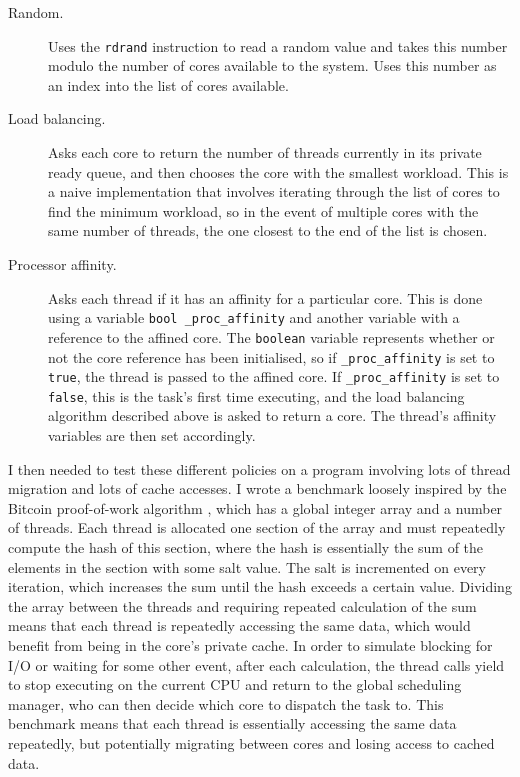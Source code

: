 \documentclass[bsc,frontabs,singlespacing,parskip,deptreport]{infthesis}
\begin{document}
\begin{description}
\item[Random.] Uses the \verb|rdrand| instruction to read a random value and takes this number modulo the number of cores available to the system. Uses this number as an index into the list of cores available.
\item[Load balancing.] Asks each core to return the number of threads currently in its private ready queue, and then chooses the core with the smallest workload. This is a naive implementation that involves iterating through the list of cores to find the minimum workload, so in the event of multiple cores with the same number of threads, the one closest to the end of the list is chosen. 
\item[Processor affinity.] Asks each thread if it has an affinity for a particular core. This is done using a variable \verb|bool _proc_affinity| and another variable with a reference to the affined core. The \verb|boolean| variable represents whether or not the core reference has been initialised, so if \verb|_proc_affinity| is set to \verb|true|, the thread is passed to the affined core. If \verb|_proc_affinity| is set to \verb|false|, this is the task's first time executing, and the load balancing algorithm described above is asked to return a core. The thread's affinity variables are then set accordingly.
\end{description}

I then needed to test these different policies on a program involving lots of thread migration and lots of cache accesses. I wrote a benchmark loosely inspired by the Bitcoin proof-of-work algorithm \cite{proof-of-work}, which has a global integer array and a number of threads. Each thread is allocated one section of the array and must repeatedly compute the hash of this section, where the hash is essentially the sum of the elements in the section with some salt value. The salt is incremented on every iteration, which increases the sum until the hash exceeds a certain value. Dividing the array between the threads and requiring repeated calculation of the sum means that each thread is repeatedly accessing the same data, which would benefit from being in the core's private cache. In order to simulate blocking for I/O or waiting for some other event, after each calculation, the thread calls yield to stop executing on the current CPU and return to the global scheduling manager, who can then decide which core to dispatch the task to. This benchmark means that each thread is essentially accessing the same data repeatedly, but potentially migrating between cores and losing access to cached data. \\
\end{document}
